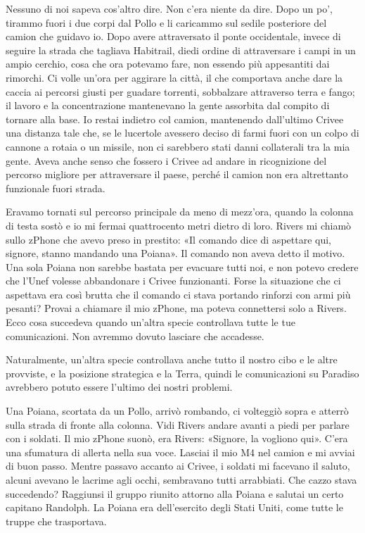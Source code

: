 Nessuno di noi sapeva cos'altro dire. Non c'era niente da dire. Dopo un
po', tirammo fuori i due corpi dal Pollo e li caricammo sul sedile
posteriore del camion che guidavo io. Dopo avere attraversato il ponte
occidentale, invece di seguire la strada che tagliava Habitrail, diedi
ordine di attraversare i campi in un ampio cerchio, cosa che ora
potevamo fare, non essendo più appesantiti dai rimorchi. Ci volle un'ora
per aggirare la città, il che comportava anche dare la caccia ai
percorsi giusti per guadare torrenti, sobbalzare attraverso terra e
fango; il lavoro e la concentrazione mantenevano la gente assorbita dal
compito di tornare alla base. Io restai indietro col camion, mantenendo
dall'ultimo Crivee una distanza tale che, se le lucertole avessero
deciso di farmi fuori con un colpo di cannone a rotaia o un missile, non
ci sarebbero stati danni collaterali tra la mia gente. Aveva anche senso
che fossero i Crivee ad andare in ricognizione del percorso migliore per
attraversare il paese, perché il camion non era altrettanto funzionale
fuori strada.

Eravamo tornati sul percorso principale da meno di mezz'ora, quando la
colonna di testa sostò e io mi fermai quattrocento metri dietro di loro.
Rivers mi chiamò sullo zPhone che avevo preso in prestito: «Il comando
dice di aspettare qui, signore, stanno mandando una Poiana». Il comando
non aveva detto il motivo. Una sola Poiana non sarebbe bastata per
evacuare tutti noi, e non potevo credere che l'Unef volesse abbandonare
i Crivee funzionanti. Forse la situazione che ci aspettava era così
brutta che il comando ci stava portando rinforzi con armi più pesanti?
Provai a chiamare il mio zPhone, ma poteva connettersi solo a Rivers.
Ecco cosa succedeva quando un'altra specie controllava tutte le tue
comunicazioni. Non avremmo dovuto lasciare che accadesse.

Naturalmente, un'altra specie controllava anche tutto il nostro cibo e
le altre provviste, e la posizione strategica e la Terra, quindi le
comunicazioni su Paradiso avrebbero potuto essere l'ultimo dei nostri
problemi.

Una Poiana, scortata da un Pollo, arrivò rombando, ci volteggiò sopra e
atterrò sulla strada di fronte alla colonna. Vidi Rivers andare avanti a
piedi per parlare con i soldati. Il mio zPhone suonò, era Rivers:
«Signore, la vogliono qui». C'era una sfumatura di allerta nella sua
voce. Lasciai il mio M4 nel camion e mi avviai di buon passo. Mentre
passavo accanto ai Crivee, i soldati mi facevano il saluto, alcuni
avevano le lacrime agli occhi, sembravano tutti arrabbiati. Che cazzo
stava succedendo? Raggiunsi il gruppo riunito attorno alla Poiana e
salutai un certo capitano Randolph. La Poiana era dell'esercito degli
Stati Uniti, come tutte le truppe che trasportava.


